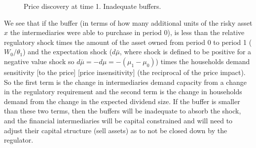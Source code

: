 \documentclass[11pt]{article}
\begin{document}
\begin{appendices}
\begin{figure}[h]
\centering
{}
\caption{Price discovery at time 1. Inadequate buffers.}
\label{fig:t1unstableEqm}
\end{figure}

We see that if the buffer (in terms of how many additional units of the risky asset $x$ the intermediaries were able to purchase in period 0), is less than the relative regulatory shock times the amount of the asset owned from period 0 to period 1 ($W_0/\theta_1$) and the expectation shock ($d\bar{\mu}$, where shock is defined to be positive for a negative value shock so $d\bar{\mu} = -d\mu = -(\mu_1-\mu_0)$) times the households demand sensitivity [to the price] [price insensitivity] (the reciprocal of the price impact). So the first term is the change in intermediaries demand capacity from a change in the regulatory requirement and the second term is the change in households demand from the change in the expected dividend size. If the buffer is smaller than these two terms, then the buffers will be inadequate to absorb the shock, and the financial intermediaries will be capital constrained and will need to adjust their capital structure (sell assets) as to not be closed down by the regulator.




\end{appendices}
\end{document}
